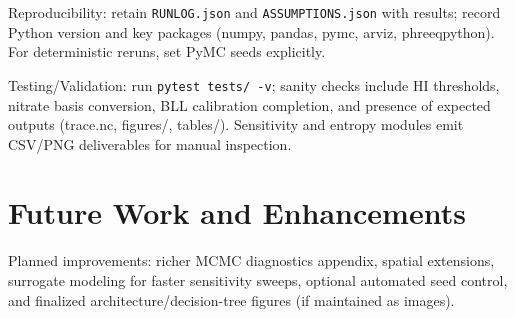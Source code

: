 \documentclass[11pt,a4paper]{article}
\begin{document}
Reproducibility: retain \texttt{RUNLOG.json} and \texttt{ASSUMPTIONS.json} with results; record Python version and key packages (numpy, pandas, pymc, arviz, phreeqpython). For deterministic reruns, set PyMC seeds explicitly.

Testing/Validation: run \texttt{pytest tests/ -v}; sanity checks include HI thresholds, nitrate basis conversion, BLL calibration completion, and presence of expected outputs (trace.nc, figures/, tables/). Sensitivity and entropy modules emit CSV/PNG deliverables for manual inspection.

\section{Future Work and Enhancements}
Planned improvements: richer MCMC diagnostics appendix, spatial extensions, surrogate modeling for faster sensitivity sweeps, optional automated seed control, and finalized architecture/decision-tree figures (if maintained as images).
\end{document}
